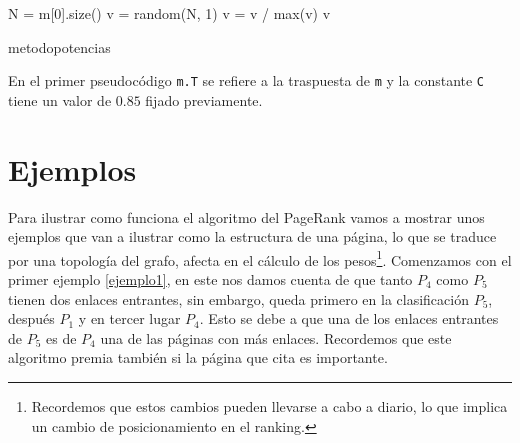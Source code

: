\documentclass[size=a4, parskip=half, titlepage=false, toc=flat, toc=bib, 12pt, twoside]{scrartcl}
\theoremstyle{theorem-style}
\theoremstyle{definition-style}
\theoremstyle{remark-style}
\theoremstyle{example-style}
\theoremstyle{definition-style}
\theoremstyle{remark-style}
\begin{document}
\begin{algorithm}[H]

  N = m[0].size()\;
  v = random(N, 1)\;
  v = v / max(v)\;
  \Return v

\caption{metodopotencias}
\end{algorithm}

En el primer pseudocódigo \verb|m.T| se refiere a la traspuesta de \verb|m| y la constante \verb|C| tiene un valor de $0.85$ fijado previamente.

\newpage

\section{Ejemplos}
Para ilustrar como funciona el algoritmo del PageRank vamos a mostrar unos ejemplos que van a ilustrar como la estructura de una página, lo que se traduce por una topología del grafo, afecta en el cálculo de los pesos\footnote{Recordemos que estos cambios pueden llevarse a cabo a diario, lo que implica un cambio de posicionamiento en el ranking.}. Comenzamos con el primer ejemplo \ref{ejemplo1}, en este nos damos cuenta de que tanto $P_4$ como $P_5$ tienen dos enlaces entrantes, sin embargo, queda primero en la clasificación $P_5$, después $P_1$ y en tercer lugar $P_4$. Esto se debe a que  una de los enlaces entrantes de $P_5$ es de $P_4$ una de las páginas con más enlaces. Recordemos que este algoritmo premia también si la página que cita es importante.
\end{document}
